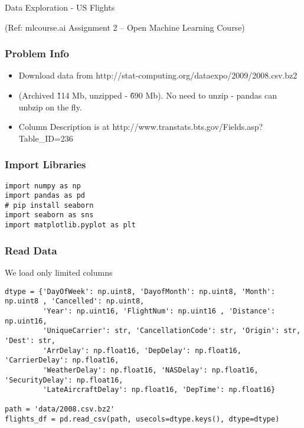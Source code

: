 \begin{frame}[fragile]\frametitle{}
\begin{center}
{\Large Data Exploration  - US Flights}

{\tiny (Ref: mlcourse.ai Assignment 2 – Open Machine Learning Course) }

\end{center}

\end{frame}


\begin{frame}[fragile]\frametitle{Problem Info}	
\begin{itemize}
\item Download data from http://stat-computing.org/dataexpo/2009/2008.csv.bz2 
\item (Archived \~ 114 Mb, unzipped - \~ 690 Mb). No need to unzip - pandas can unbzip on the fly.
\item Column Description is at http://www.transtats.bts.gov/Fields.asp?Table\_ID=236
\end{itemize}
\end{frame}

\begin{frame}[fragile]\frametitle{Import Libraries}	
\begin{lstlisting}
import numpy as np
import pandas as pd
# pip install seaborn 
import seaborn as sns
import matplotlib.pyplot as plt
\end{lstlisting}
\end{frame}


\begin{frame}[fragile]\frametitle{Read Data}	
We load only limited columns
\begin{lstlisting}
dtype = {'DayOfWeek': np.uint8, 'DayofMonth': np.uint8, 'Month': np.uint8 , 'Cancelled': np.uint8, 
         'Year': np.uint16, 'FlightNum': np.uint16 , 'Distance': np.uint16, 
         'UniqueCarrier': str, 'CancellationCode': str, 'Origin': str, 'Dest': str,
         'ArrDelay': np.float16, 'DepDelay': np.float16, 'CarrierDelay': np.float16,
         'WeatherDelay': np.float16, 'NASDelay': np.float16, 'SecurityDelay': np.float16,
         'LateAircraftDelay': np.float16, 'DepTime': np.float16}
		 
path = 'data/2008.csv.bz2'
flights_df = pd.read_csv(path, usecols=dtype.keys(), dtype=dtype)		 
\end{lstlisting}
\end{frame}

